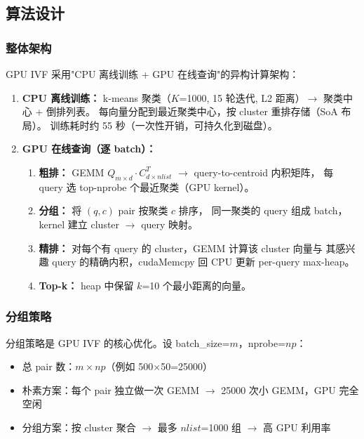 \documentclass[UTF8,a4paper,10pt]{ctexart}
\begin{document}
\subsection{算法设计}

\subsubsection{整体架构}

GPU IVF 采用"CPU 离线训练 + GPU 在线查询"的异构计算架构：

\begin{enumerate}[itemsep=0pt]
\item \textbf{CPU 离线训练：} k-means 聚类（$K$=1000, 15 轮迭代, L2 距离）$\to$ 聚类中心 + 倒排列表。
每向量分配到最近聚类中心，按 cluster 重排存储（SoA 布局）。
训练耗时约 55 秒（一次性开销，可持久化到磁盘）。
\item \textbf{GPU 在线查询（逐 batch）：}
  \begin{enumerate}[itemsep=0pt]
  \item \textbf{粗排：} GEMM $Q_{m \times d} \cdot C^T_{d \times nlist}$ $\to$ query-to-centroid 内积矩阵，
  每 query 选 top-nprobe 个最近聚类（GPU kernel）。
  \item \textbf{分组：} 将 $(q, c)$ pair 按聚类 $c$ 排序，
  同一聚类的 query 组成 batch，kernel 建立 cluster $\to$ query 映射。
  \item \textbf{精排：} 对每个有 query 的 cluster，GEMM 计算该 cluster 向量与
  其感兴趣 query 的精确内积，cudaMemcpy 回 CPU 更新 per-query max-heap。
  \item \textbf{Top-k：} heap 中保留 $k$=10 个最小距离的向量。
  \end{enumerate}
\end{enumerate}

\subsubsection{分组策略}

分组策略是 GPU IVF 的核心优化。设 batch\_size=$m$，nprobe=$np$：
\begin{itemize}[itemsep=0pt]
\item 总 pair 数：$m \times np$（例如 500$\times$50=25000）
\item 朴素方案：每个 pair 独立做一次 GEMM $\to$ 25000 次小 GEMM，GPU 完全空闲
\item 分组方案：按 cluster 聚合 $\to$ 最多 $nlist$=1000 组 $\to$ 高 GPU 利用率
\end{itemize}
\end{document}
